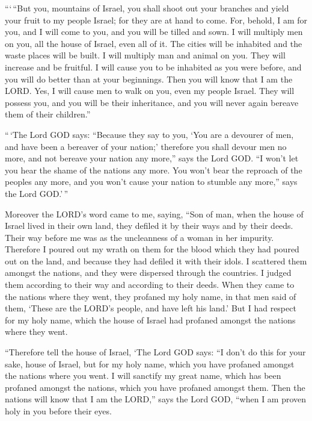  ```\,``But you, mountains of Israel, you shall shoot out
your branches and yield your fruit to my people Israel; for they are at
hand to come.  For, behold, I am for you, and I will come to
you, and you will be tilled and sown.  I will multiply men
on you, all the house of Israel, even all of it. The cities will be
inhabited and the waste places will be built.  I will
multiply man and animal on you. They will increase and be fruitful. I
will cause you to be inhabited as you were before, and you will do
better than at your beginnings. Then you will know that I am the LORD.
 Yes, I will cause men to walk on you, even my people
Israel. They will possess you, and you will be their inheritance, and
you will never again bereave them of their children.''

 ``\,`The Lord GOD says: ``Because they say to you, `You
are a devourer of men, and have been a bereaver of your nation;'
 therefore you shall devour men no more, and not bereave
your nation any more,'' says the Lord GOD.  ``I won't let
you hear the shame of the nations any more. You won't bear the reproach
of the peoples any more, and you won't cause your nation to stumble any
more,'' says the Lord GOD.'\,''

 Moreover the LORD's word came to me, saying, 
``Son of man, when the house of Israel lived in their own land, they
defiled it by their ways and by their deeds. Their way before me was as
the uncleanness of a woman in her impurity.  Therefore I
poured out my wrath on them for the blood which they had poured out on
the land, and because they had defiled it with their idols.
 I scattered them amongst the nations, and they were
dispersed through the countries. I judged them according to their way
and according to their deeds.  When they came to the
nations where they went, they profaned my holy name, in that men said of
them, `These are the LORD's people, and have left his land.'
 But I had respect for my holy name, which the house of
Israel had profaned amongst the nations where they went.

 ``Therefore tell the house of Israel, `The Lord GOD says:
``I don't do this for your sake, house of Israel, but for my holy name,
which you have profaned amongst the nations where you went.
 I will sanctify my great name, which has been profaned
amongst the nations, which you have profaned amongst them. Then the
nations will know that I am the LORD,'' says the Lord GOD, ``when I am
proven holy in you before their eyes.

